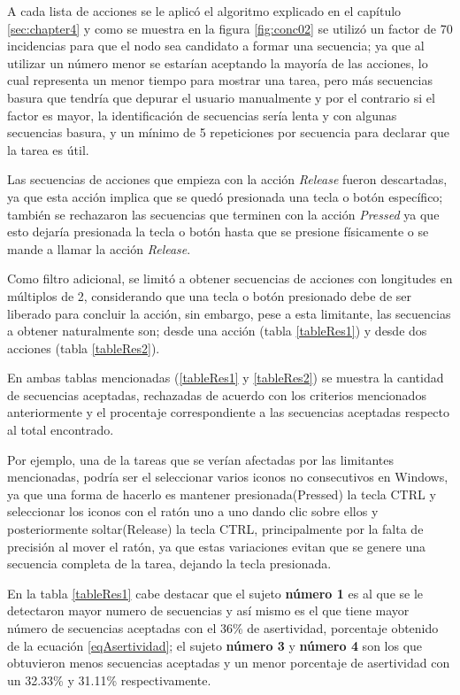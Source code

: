 A cada lista de acciones se le aplic\'o el algoritmo explicado en el cap\'itulo 
 \ref{sec:chapter4} y como se muestra en la figura \ref{fig:conc02} se 
 utiliz\'o un factor de 70 incidencias para que el  nodo sea candidato a formar 
 una secuencia; ya que al utilizar un n\'umero menor se estar\'ian aceptando la 
 mayor\'ia de las acciones, lo cual representa un menor tiempo para mostrar una 
 tarea, pero m\'as secuencias basura que tendr\'ia que depurar el usuario 
 manualmente y por el contrario si el factor es mayor, la identificaci\'on de 
 secuencias ser\'ia lenta y con algunas secuencias basura, y un m\'inimo de 5 
 repeticiones por secuencia para declarar que la tarea es \'util. 


Las secuencias de acciones que empieza con la acci\'on \emph{Release} fueron 
 descartadas, ya que esta acci\'on implica que se qued\'o presionada una tecla 
 o bot\'on espec\'ifico; tambi\'en se rechazaron las secuencias que terminen 
 con la acci\'on \emph{Pressed} ya que esto dejar\'ia presionada la tecla o 
 bot\'on hasta que se presione f\'isicamente o se mande a llamar la acci\'on 
 \emph{Release}.


Como filtro adicional, se limit\'o a obtener secuencias de 
 acciones con longitudes en m\'ultiplos de 2, considerando que una tecla o 
 bot\'on presionado debe de ser liberado para concluir la acci\'on, sin 
 embargo, pese a esta limitante, las secuencias a obtener naturalmente son; 
 desde una acci\'on (tabla \ref{tableRes1}) y desde dos acciones (tabla 
 \ref{tableRes2}).
 

En ambas tablas mencionadas (\ref{tableRes1} y \ref{tableRes2}) se 
 muestra la cantidad de secuencias aceptadas, rechazadas de acuerdo con los 
 criterios mencionados anteriormente y el procentaje correspondiente a las 
 secuencias aceptadas respecto al total encontrado. 
 
 
Por ejemplo, una de la tareas que se ver\'ian afectadas por las limitantes
 mencionadas, podr\'ia ser el seleccionar varios iconos no consecutivos en 
 Windows, ya que una forma de hacerlo es mantener presionada(Pressed) la tecla 
 CTRL y seleccionar los iconos con el rat\'on uno a uno dando clic sobre ellos y 
 posteriormente soltar(Release) la tecla CTRL, principalmente por la falta de 
 precisi\'on al mover el rat\'on, ya que estas variaciones evitan que se genere 
 una secuencia completa de la tarea, dejando la tecla presionada.


En la tabla \ref{tableRes1} cabe destacar que el sujeto \textbf{n\'umero 1}
 es al que se le detectaron mayor numero de secuencias y as\'i mismo es el que 
 tiene mayor n\'umero de secuencias aceptadas con el 36\% de asertividad,
 porcentaje obtenido de la ecuaci\'on \ref{eqAsertividad}; el 
 sujeto \textbf{n\'umero 3} y \textbf{n\'umero 4} son los que obtuvieron menos 
 secuencias aceptadas y un menor porcentaje de asertividad con un 32.33\% y 
 31.11\% respectivamente.

